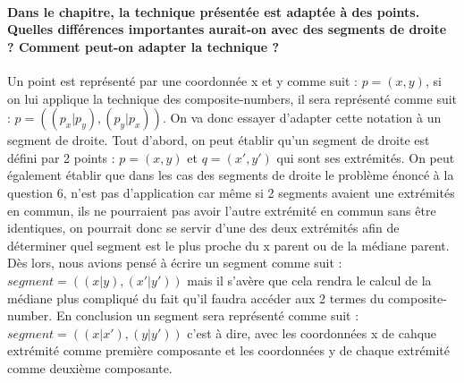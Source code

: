 \documentclass{article}
\begin{document}
    \paragraph{Dans le chapitre, la technique présentée est adaptée à des points. Quelles différences
    importantes aurait-on avec des segments de droite ? Comment peut-on adapter la technique ?}
    Un point est représenté par une coordonnée x et y comme suit : $p = (x,y)$, si on lui applique la technique des composite-numbers, il sera
    représenté comme suit : $p = ((p_x|p_y),(p_y|p_x))$. On va donc essayer d'adapter cette notation à un segment de droite. Tout d'abord, 
    on peut établir qu'un segment de droite est défini par 2 points : $p = (x,y)$ et $q=(x',y')$ qui sont ses extrémités. On peut également
    établir que dans les cas des segments de droite le problème énoncé à la question 6, n'est pas d'application car même si 2 segments avaient
    une extrémités en commun, ils ne pourraient pas avoir l'autre extrémité en commun sans être identiques, on pourrait donc se servir d'une 
    des deux extrémités afin de déterminer quel segment est le plus proche du x parent ou de la médiane parent. Dès lors, nous avions pensé
    à écrire un segment comme suit : $segment = ((x|y),(x'|y'))$ mais il s'avère que cela rendra le calcul de la médiane plus compliqué du fait
    qu'il faudra accéder aux 2 termes du composite-number. En conclusion un segment sera représenté comme suit : $segment = ((x|x'),(y|y'))$ c'est à dire,
    avec les coordonnées x de cahque extrémité comme première composante et les coordonnées y de chaque extrémité comme deuxième composante.
\end{document}
